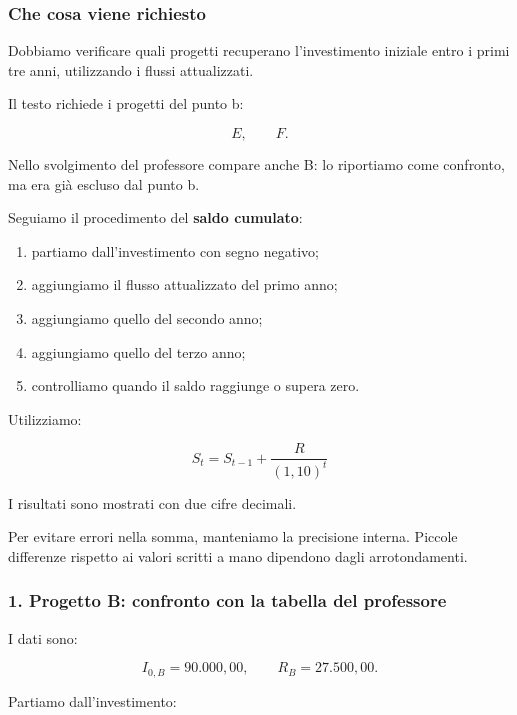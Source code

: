 \subsubsection*{Che cosa viene richiesto}

\noindent Dobbiamo verificare
quali progetti recuperano
l'investimento iniziale
entro i primi tre anni,
utilizzando i flussi attualizzati.

\noindent Il testo richiede
i progetti del punto b:

\[
E,\qquad F.
\]

\noindent Nello svolgimento del professore
compare anche B:
lo riportiamo come confronto,
ma era già escluso dal punto b.

\medskip

\noindent Seguiamo il procedimento
del \textbf{saldo cumulato}:

\begin{enumerate}
    \item partiamo dall'investimento
    con segno negativo;

    \item aggiungiamo il flusso attualizzato
    del primo anno;

    \item aggiungiamo quello del secondo anno;

    \item aggiungiamo quello del terzo anno;

    \item controlliamo quando il saldo
    raggiunge o supera zero.
\end{enumerate}

\noindent Utilizziamo:

\[
\boxed{
S_t=S_{t-1}+\frac{R}{(1{,}10)^t}
}
\]

\noindent I risultati sono mostrati
con due cifre decimali.

\noindent Per evitare errori nella somma,
manteniamo la precisione interna.
Piccole differenze rispetto ai valori
scritti a mano dipendono
dagli arrotondamenti.


\subsubsection*{1. Progetto B:
confronto con la tabella del professore}

\noindent I dati sono:

\[
I_{0,B}=90.000{,}00,
\qquad
R_B=27.500{,}00.
\]

\noindent Partiamo dall'investimento:

